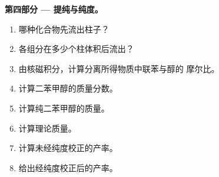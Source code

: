 \begin{problem}
\medskip
\noindent\textbf{第四部分 --- 提纯与纯度。}
\begin{enumerate}[resume]
  \item 哪种化合物先流出柱子？
  \item 各组分在多少个柱体积后流出？
  \item 由核磁积分，计算分离所得物质中联苯与醇的
        摩尔比。
  \item 计算二苯甲醇的质量分数。
  \item 计算纯二苯甲醇的质量。
  \item 计算理论质量。
  \item 计算未经纯度校正的产率。
  \item 给出经纯度校正后的产率。
\end{enumerate}
\end{problem}
